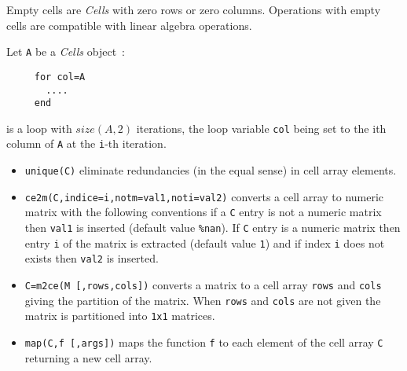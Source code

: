 
Empty cells are \emph{Cells} with zero rows or zero columns. Operations with empty cells
are compatible with linear algebra operations. 

Let \verb+A+ be a \emph{Cells} object~:
\begin{verbatim}
     for col=A
       ....
     end
\end{verbatim} 
is a loop with $size(A,2)$ iterations, the loop 
variable  \verb+col+ being set to the ith column of \verb+A+ at the \verb!i!-th iteration.

\begin{itemize}
   \item \verb+unique(C)+ eliminate redundancies (in the equal sense) in cell array elements. 
   \item \verb+ce2m(C,indice=i,notm=val1,noti=val2)+ converts a cell array to numeric matrix
     with the following conventions if a \verb+C+ entry is not a numeric matrix then \verb!val1! is inserted 
     (default value \verb!%nan!). If \verb+C+ entry is a numeric matrix then entry \verb!i! of the matrix 
     is extracted (default value \verb!1!) and if index \verb!i! does not exists then \verb!val2! is inserted.
     \label{ce2m}
   \item \verb+C=m2ce(M [,rows,cols])+ converts a matrix to a cell array \verb+rows+ and \verb+cols+ giving the 
     partition of the matrix. When \verb+rows+ and \verb+cols+ are not given the matrix is partitioned into \verb!1x1! 
     matrices.
     \label{m2ce}
   \item \verb+map(C,f [,args])+ maps the function \verb!f! to each element of the cell array \verb!C! returning 
     a new cell array.
     \label{map}
\end{itemize}

